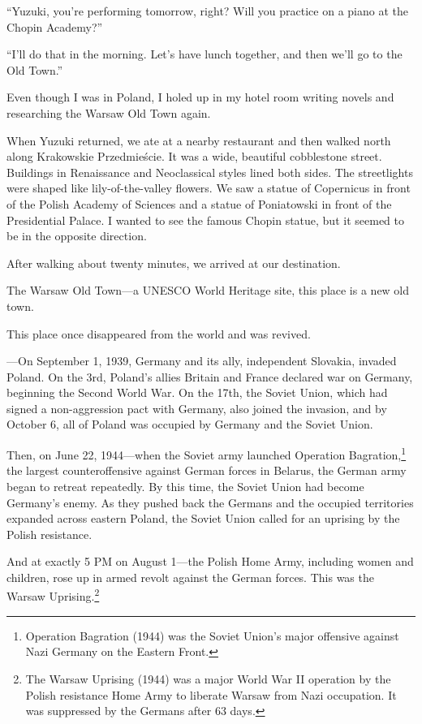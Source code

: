 \documentclass[
    a4paper,
    12pt,
    twoside,
    openany,
    UTF8,
    fontset=windows
]{ctexbook}
\begin{document}
``Yuzuki, you're performing tomorrow, right? Will you practice on a piano at the Chopin Academy?''

``I'll do that in the morning. Let's have lunch together, and then we'll go to the Old Town.''

Even though I was in Poland, I holed up in my hotel room writing novels and researching the Warsaw Old Town again.

When Yuzuki returned, we ate at a nearby restaurant and then walked north along Krakowskie Przedmieście. It was a wide, beautiful cobblestone street. Buildings in Renaissance and Neoclassical styles lined both sides. The streetlights were shaped like lily-of-the-valley flowers. We saw a statue of Copernicus in front of the Polish Academy of Sciences and a statue of Poniatowski in front of the Presidential Palace. I wanted to see the famous Chopin statue, but it seemed to be in the opposite direction.

After walking about twenty minutes, we arrived at our destination.

The Warsaw Old Town---a UNESCO World Heritage site, this place is a new old town.

This place once disappeared from the world and was revived.

---On September 1, 1939, Germany and its ally, independent Slovakia, invaded Poland. On the 3rd, Poland's allies Britain and France declared war on Germany, beginning the Second World War. On the 17th, the Soviet Union, which had signed a non-aggression pact with Germany, also joined the invasion, and by October 6, all of Poland was occupied by Germany and the Soviet Union.

Then, on June 22, 1944---when the Soviet army launched Operation Bagration,\footnote{Operation Bagration (1944) was the Soviet Union's major offensive against Nazi Germany on the Eastern Front.} the largest counteroffensive against German forces in Belarus, the German army began to retreat repeatedly. By this time, the Soviet Union had become Germany's enemy. As they pushed back the Germans and the occupied territories expanded across eastern Poland, the Soviet Union called for an uprising by the Polish resistance.

And at exactly 5 PM on August 1---the Polish Home Army, including women and children, rose up in armed revolt against the German forces. This was the Warsaw Uprising.\footnote{The Warsaw Uprising (1944) was a major World War II operation by the Polish resistance Home Army to liberate Warsaw from Nazi occupation. It was suppressed by the Germans after 63 days.}
\end{document}
